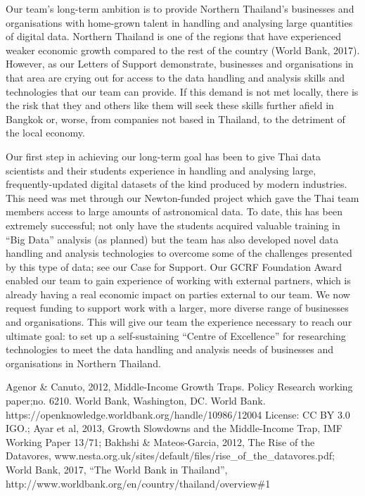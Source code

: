 \documentclass[11pt]{article}
\begin{document}
  \vspace{2mm}
  \noindent
  Our team's long-term ambition is to provide Northern Thailand's businesses and organisations with home-grown talent in handling and analysing large quantities of digital data. Northern Thailand is one of the regions that have experienced weaker economic growth compared to the rest of the country (World Bank, 2017). However, as our Letters of Support demonstrate, businesses and organisations in that area are crying out for access to the data handling and analysis skills and technologies that our team can provide. If this demand is not met locally, there is the risk that they and others like them will seek these skills further afield in Bangkok or, worse, from companies not based in Thailand, to the detriment of the local economy.
  
  \vspace{2mm}
  \noindent
  Our first step in achieving our long-term goal has been to give Thai data scientists and their students experience in handling and analysing large, frequently-updated digital datasets of the kind produced by modern industries. This need was met through our Newton-funded project which gave the Thai team members access to large amounts of astronomical data. To date, this has been extremely successful; not only have the students acquired valuable training in ``Big Data'' analysis (as planned) but the team has also developed novel data handling and analysis technologies to overcome some of the challenges presented by this type of data; see our Case for Support. Our GCRF Foundation Award enabled our team to gain experience of working with external partners, which is already having a real economic impact on parties external to our team. We now request funding to support work with a larger, more diverse range of businesses and organisations. This will give our team the experience necessary to reach our ultimate goal: to set up a self-sustaining ``Centre of Excellence'' for researching technologies to meet the data handling and analysis needs of businesses and organisations in Northern Thailand.
  
  \vspace{2mm}
   {\scriptsize Agenor \& Canuto, 2012, Middle-Income Growth Traps. Policy Research working paper;no. 6210. World Bank, Washington, DC. World Bank. https://openknowledge.worldbank.org/handle/10986/12004 License: CC BY 3.0 IGO.; Ayar et al, 2013, Growth Slowdowns and the Middle-Income Trap, IMF Working Paper 13/71; Bakhshi \& Mateos-Garcia, 2012, The Rise of the Datavores, www.nesta.org.uk/sites/default/files/rise\_of\_the\_datavores.pdf; World Bank, 2017, ``The World Bank in Thailand'', http://www.worldbank.org/en/country/thailand/overview\#1}
  
  
  
  
\end{document}
